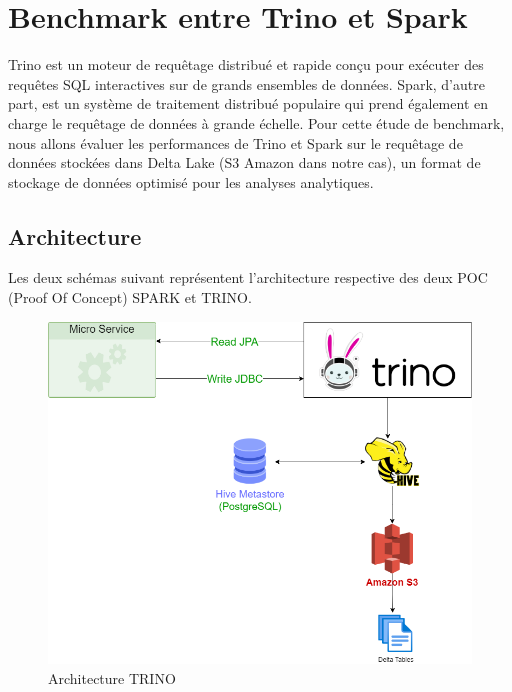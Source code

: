 \section{Benchmark entre Trino et Spark}
Trino est un moteur de requêtage distribué et rapide conçu pour exécuter des requêtes SQL interactives sur de grands ensembles de données. Spark, d'autre part, est un système de traitement distribué populaire qui prend également en charge le requêtage de données à grande échelle.
Pour cette étude de benchmark, nous allons évaluer les performances de Trino et Spark sur le requêtage de données stockées dans Delta Lake (S3 Amazon dans notre cas), un format de stockage de données optimisé pour les analyses analytiques.

\subsection{Architecture}
Les deux schémas suivant représentent l’architecture respective des deux POC (Proof Of Concept) SPARK et TRINO.

\begin{figure}[H]
\centering
\includegraphics[width=\linewidth]{images/trino_microservice.png}
\caption{Architecture TRINO}\label{fig:arch-trino}
\end{figure}

